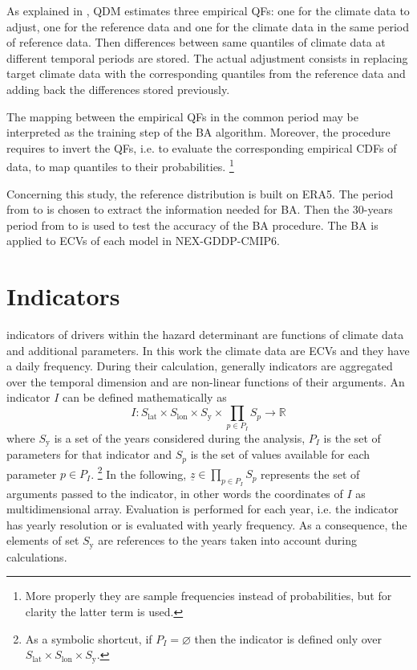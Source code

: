 As explained in \cite[6941-6942]{2015CannonBiasCorrection}, \gls{QDM} estimates three empirical \glspl{QF}: one for the climate data to adjust, one for the reference data and one for the climate data in the same period of reference data. Then differences between same quantiles of climate data at different temporal periods are stored. The actual adjustment consists in replacing target climate data with the corresponding quantiles from the reference data and adding back the differences stored previously.

The mapping between the empirical \glspl{QF} in the common period may be interpreted as the training step of the \gls{BA} algorithm. Moreover, the procedure requires to invert the \glspl{QF}, i.e. to evaluate the corresponding empirical \glspl{CDF} of data, to map quantiles to their probabilities.%
\footnote{More properly they are sample frequencies instead of probabilities, but for clarity the latter term is used.}

Concerning this study, the reference distribution is built on ERA5. The period from  to  is chosen to extract the information needed for \gls{BA}. Then the 30-years period from  to  is used to test the accuracy of the \gls{BA} procedure.
The \gls{BA} is applied to \glspl{ECV} of each model in NEX-GDDP-CMIP6.



\section{Indicators}
\label{sec:Indicators}
\Glspl{indicator} of \glspl{driver} within the \gls{hazard} \gls{determinant} are functions of climate data and additional parameters. In this work the climate data are \glspl{ECV} and they have a daily frequency.
During their calculation, generally \glspl{indicator} are aggregated over the temporal dimension and are non-linear functions of their arguments.
An \gls{indicator} $I$ can be defined mathematically as
\begin{equation}
  \label{eq:math_indicator}
  I : S_\text{lat} \times S_\text{lon} \times S_\text{y} \times \prod_{p \in P_I} S_p \to \mathbb{R}
\end{equation}
where $S_\text{y}$ is a set of the years considered during the analysis, $P_I$ is the set of parameters for that indicator and $S_p$ is the set of values available for each parameter $p \in P_I$.%
\footnote{As a symbolic shortcut, if $P_I = \varnothing$ then the indicator is defined only over $S_\text{lat} \times S_\text{lon} \times S_\text{y}$.}
In the following, $\underline{z} \in \prod_{p \in P_I} S_p$ represents the set of arguments passed to the \gls{indicator}, in other words the coordinates of $I$ as multidimensional array.
Evaluation is performed for each year, i.e. the \gls{indicator} has yearly resolution or is evaluated with yearly frequency. As a consequence, the elements of set $S_\text{y}$ are references to the years taken into account during calculations.

